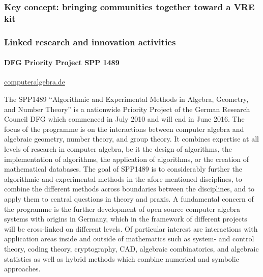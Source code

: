 \subsubsection{Key concept: bringing communities together toward a VRE kit}




\subsubsection{Linked research and innovation activities}



\paragraph{DFG Priority Project SPP 1489}
\url{computeralgebra.de}

The SPP1489 ``Algorithmic and Experimental Methods in Algebra, Geometry, and
Number Theory'' is a nationwide Priority Project of the German Research Council DFG  
which commenced in July  2010 and will end in June 2016. The focus of the programme 
is on the interactions between computer algebra and algebraic geometry, number theory, 
and group theory. It combines expertise at all levels of research in computer algebra, 
be it the design of algorithms, the implementation of algorithms, the application
of algorithms, or the creation of mathematical databases. The goal of SPP1489 is to 
considerably further the algorithmic and experimental methods in the afore mentioned
disciplines, to combine the different methods across boundaries between the disciplines, 
and to apply them to central questions in theory and praxis. A fundamental concern of the
programme is the further development of open source
computer algebra systems with origins in Germany, which in
the framework of different projects will be cross-linked on
different levels. Of particular interest are interactions with application areas inside
and outside of mathematics such as system- and control theory, coding
theory, cryptography, CAD, algebraic combinatorics, and algebraic
statistics as well as hybrid methods which combine numerical and
symbolic approaches. 

